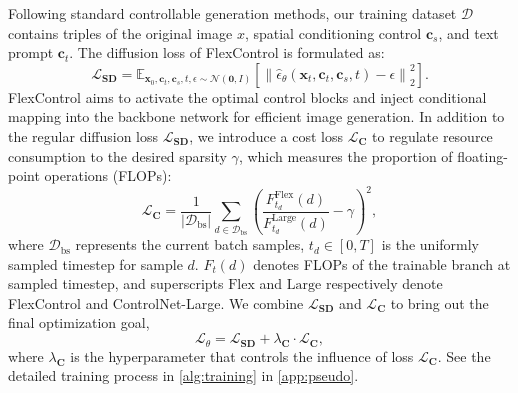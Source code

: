 Following standard controllable generation methods, our training dataset $\mathcal{D}$ contains triples of the original image $x$, spatial conditioning control $\mathbf{c}_{s}$, and text prompt $\mathbf{c}_{t}$. The diffusion loss of FlexControl is formulated as:
\begin{equation}
    \mathcal{L}_{\mathbf{SD}}=\mathbb{E}_{\mathbf{x}_{0},\mathbf{c}_{t},\mathbf{c}_{s},t,\epsilon\sim \mathcal{N}\left(\mathbf{0},\boldsymbol{\mathit{I}}\right)}\left[\left\|\hat{\epsilon}_{\theta}\left(\mathbf{x}_{t},\mathbf{c}_{t},\mathbf{c}_{s},t\right)-\epsilon \right\|_{2}^{2}\right].
\label{eq:losssd}
\end{equation}
FlexControl aims to activate the optimal control blocks and inject conditional mapping into the backbone network for efficient image generation. In addition to the regular diffusion loss $\mathcal{L}_{\mathbf{SD}}$, we introduce a cost loss $\mathcal{L}_{\mathbf{C}}$ to regulate resource consumption to the desired sparsity $\gamma$, which measures the proportion of floating-point operations (FLOPs):
\begin{equation} 
\mathcal{L}_{\mathbf{C}}=\frac{1}{\left|\mathcal{D}_{\mathrm{bs}}\right|}\sum_{d\in\mathcal{D}_{\mathrm{bs}}}\left(\frac{F^{\mathrm{Flex}}_{t_d}\left(d\right)}{F^{\mathrm{Large}}_{t_d}\left(d\right)}-\gamma\right)^{2},
\label{eq:losscost}
\end{equation}
where $\mathcal{D}_{\mathrm{bs}}$ represents the current batch samples, $t_d\in \left[0,T\right]$ is the uniformly sampled timestep for sample $d$. $F_{t}\left(d\right)$ denotes FLOPs of the trainable branch at sampled timestep, and superscripts $\mathrm{Flex}$ and $\mathrm{Large}$ respectively denote FlexControl and ControlNet-Large. We combine $\mathcal{L}_{\mathbf{SD}}$ and $\mathcal{L}_{\mathbf{C}}$ to bring out the final optimization goal,
\begin{equation} 
 \mathcal{L}_{\theta}= \mathcal{L}_{\mathbf{SD}}+\lambda_{\mathbf{C}}\cdot\mathcal{L}_{\mathbf{C}},
 \label{eq:losstheta}
\end{equation}
where $\lambda_{\mathbf{C}}$ is the hyperparameter that controls the influence of loss $\mathcal{L}_{\mathbf{C}}$. See the detailed training process in \cref{alg:training} in \cref{app:pseudo}.
